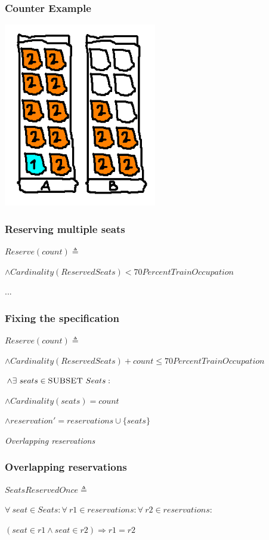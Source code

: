 \documentclass{beamer}
\begin{document}
\begin{frame}
  \frametitle{Counter Example}
  
  \begin{center}
    \includegraphics[width=0.5\textwidth]{tla-introduction/over-70-multiple-reservation}
  \end{center}
\end{frame}

\begin{frame}
  \frametitle{Reserving multiple seats}
  
  $Reserve(count) \triangleq$
  
  $\land Cardinality(ReservedSeats) < 70PercentTrainOccupation$
  
  $...$
\end{frame}

\begin{frame}
  \frametitle{Fixing the specification}
  
  $Reserve(count) \triangleq$
  
  $\land Cardinality(ReservedSeats) + count \le 70PercentTrainOccupation$
  
  $\land \exists\ seats \in \textsc{SUBSET}\ Seats :$
  
  $\land Cardinality(seats) = count$
  
  $\land reservation' = reservations \cup \{seats\}$
\end{frame}

\begin{frame}
  \centering \Huge \emph{Overlapping reservations}
\end{frame}

\begin{frame}
  \frametitle{Overlapping reservations}
  
  $SeatsReservedOnce \triangleq$
  
  $\forall\ seat \in Seats : \forall\ r1 \in reservations : \forall\ r2 \in reservations :$
  
  $(seat \in r1 \land seat \in r2) \Rightarrow r1 = r2$
\end{frame}
\end{document}
